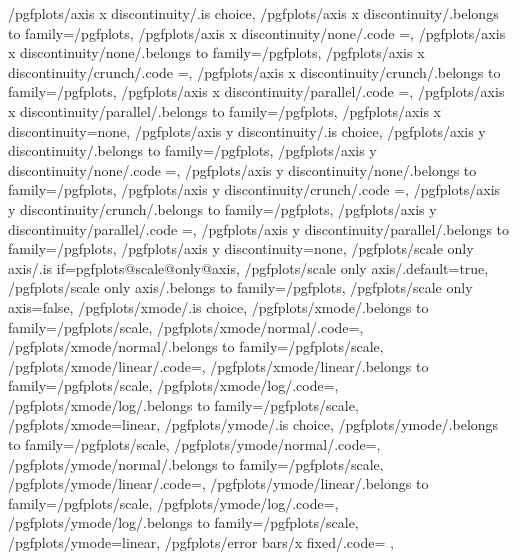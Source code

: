 {%
	/pgfplots/axis x discontinuity/.is choice,
	/pgfplots/axis x discontinuity/.belongs to family=/pgfplots, %
	/pgfplots/axis x discontinuity/none/.code	={\def\pgfplots@xaxisdiscontnum{0}},
	/pgfplots/axis x discontinuity/none/.belongs to family=/pgfplots, %
	/pgfplots/axis x discontinuity/crunch/.code	={\def\pgfplots@xaxisdiscontnum{1}},
	/pgfplots/axis x discontinuity/crunch/.belongs to family=/pgfplots, %
	/pgfplots/axis x discontinuity/parallel/.code	={\def\pgfplots@xaxisdiscontnum{2}},
	/pgfplots/axis x discontinuity/parallel/.belongs to family=/pgfplots, %
	/pgfplots/axis x discontinuity=none,
	/pgfplots/axis y discontinuity/.is choice,
	/pgfplots/axis y discontinuity/.belongs to family=/pgfplots, %
	/pgfplots/axis y discontinuity/none/.code	={\def\pgfplots@yaxisdiscontnum{0}},
	/pgfplots/axis y discontinuity/none/.belongs to family=/pgfplots, %
	/pgfplots/axis y discontinuity/crunch/.code	={\def\pgfplots@yaxisdiscontnum{1}},
	/pgfplots/axis y discontinuity/crunch/.belongs to family=/pgfplots, %
	/pgfplots/axis y discontinuity/parallel/.code	={\def\pgfplots@yaxisdiscontnum{2}},
	/pgfplots/axis y discontinuity/parallel/.belongs to family=/pgfplots, %
	/pgfplots/axis y discontinuity=none,
	/pgfplots/scale only axis/.is if=pgfplots@scale@only@axis,
	/pgfplots/scale only axis/.default=true,
	/pgfplots/scale only axis/.belongs to family=/pgfplots,
	/pgfplots/scale only axis=false,
	/pgfplots/xmode/.is choice,
	/pgfplots/xmode/.belongs to family=/pgfplots/scale,
	/pgfplots/xmode/normal/.code={\pgfplots@xislineartrue},
	/pgfplots/xmode/normal/.belongs to family=/pgfplots/scale,
	/pgfplots/xmode/linear/.code={\pgfplots@xislineartrue},
	/pgfplots/xmode/linear/.belongs to family=/pgfplots/scale,
	/pgfplots/xmode/log/.code={\pgfplots@xislinearfalse},
	/pgfplots/xmode/log/.belongs to family=/pgfplots/scale,
	/pgfplots/xmode=linear,
	/pgfplots/ymode/.is choice,
	/pgfplots/ymode/.belongs to family=/pgfplots/scale,
	/pgfplots/ymode/normal/.code={\pgfplots@yislineartrue},
	/pgfplots/ymode/normal/.belongs to family=/pgfplots/scale,
	/pgfplots/ymode/linear/.code={\pgfplots@yislineartrue},
	/pgfplots/ymode/linear/.belongs to family=/pgfplots/scale,
	/pgfplots/ymode/log/.code={\pgfplots@yislinearfalse},
	/pgfplots/ymode/log/.belongs to family=/pgfplots/scale,
	/pgfplots/ymode=linear,
	/pgfplots/error bars/x fixed/.code=				\def\pgfplots@errorbars@xfixed{#1}\def\pgfplots@errorbars@xmode{0},
}
